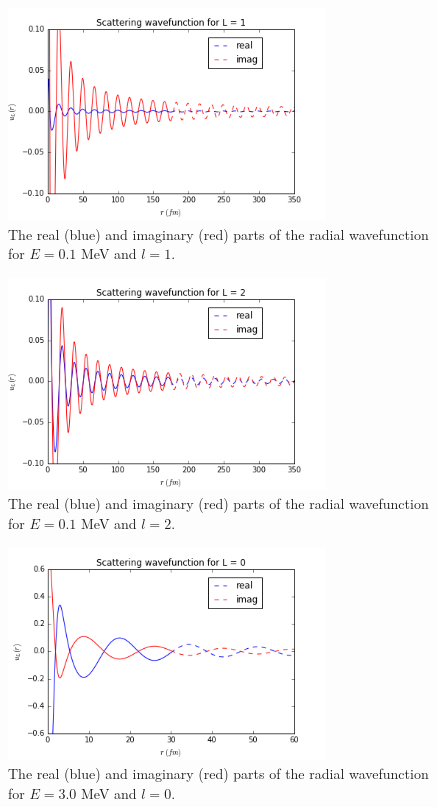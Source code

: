 \documentclass[]{scrartcl}
\begin{document}
\begin{figure}
\centering
	\includegraphics[width=0.75\textwidth]{figures/E01/l1.png}
	\caption{The real (blue) and imaginary (red) parts of the radial wavefunction for $E = 0.1$ MeV and $l=1$.}
	\label{fig:e01l1}
\end{figure}

\begin{figure}
\centering
	\includegraphics[width=0.75\textwidth]{figures/E01/l2.png}
	\caption{The real (blue) and imaginary (red) parts of the radial wavefunction for $E = 0.1$ MeV and $l=2$.}
	\label{fig:e01l2}
\end{figure}


\begin{figure}
\centering
	\includegraphics[width=0.75\textwidth]{figures/E30/l0.png}
	\caption{The real (blue) and imaginary (red) parts of the radial wavefunction for $E = 3.0$ MeV and $l=0$.}
	\label{fig:e30l0}
\end{figure}
\end{document}
